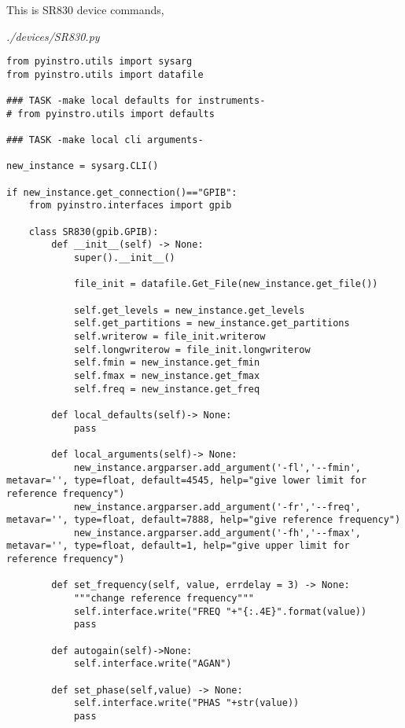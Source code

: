 
This is SR830 device commands,

\emph{./devices/SR830.py}

\begin{verbatim}
from pyinstro.utils import sysarg
from pyinstro.utils import datafile

### TASK -make local defaults for instruments-
# from pyinstro.utils import defaults

### TASK -make local cli arguments-

new_instance = sysarg.CLI()

if new_instance.get_connection()=="GPIB":
    from pyinstro.interfaces import gpib
    
    class SR830(gpib.GPIB):
        def __init__(self) -> None:
            super().__init__()

            file_init = datafile.Get_File(new_instance.get_file())
            
            self.get_levels = new_instance.get_levels
            self.get_partitions = new_instance.get_partitions
            self.writerow = file_init.writerow
            self.longwriterow = file_init.longwriterow
            self.fmin = new_instance.get_fmin
            self.fmax = new_instance.get_fmax
            self.freq = new_instance.get_freq

        def local_defaults(self)-> None:
            pass

        def local_arguments(self)-> None:
            new_instance.argparser.add_argument('-fl','--fmin', metavar='', type=float, default=4545, help="give lower limit for reference frequency")
            new_instance.argparser.add_argument('-fr','--freq', metavar='', type=float, default=7888, help="give reference frequency")
            new_instance.argparser.add_argument('-fh','--fmax', metavar='', type=float, default=1, help="give upper limit for reference frequency")
    
        def set_frequency(self, value, errdelay = 3) -> None:
            """change reference frequency"""
            self.interface.write("FREQ "+"{:.4E}".format(value))
            pass

        def autogain(self)->None:
            self.interface.write("AGAN")

        def set_phase(self,value) -> None:
            self.interface.write("PHAS "+str(value))
            pass


\end{verbatim}
